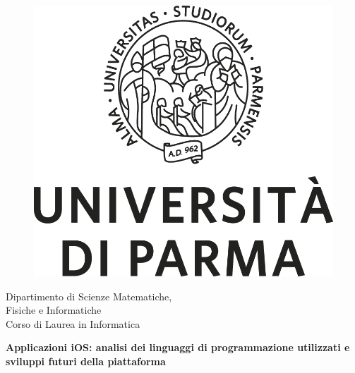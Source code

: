\begin{titlepage}
  \hypersetup{pageanchor=false}

  \begin{center}
    \begin{figure}
      \centering
      \includegraphics[scale=0.20]{logouni.png}
            \vspace{0.8cm}
    \end{figure}


    \begin{Large}
      Dipartimento di Scienze Matematiche,\\Fisiche e Informatiche\\
      \medskip
      Corso di Laurea in Informatica \\
      \medskip
      \vspace{0.8cm}
      
      \begin{huge}
        \textbf{Applicazioni iOS: analisi dei linguaggi di programmazione utilizzati e sviluppi futuri della piattaforma} \\
      \end{huge}
      
      \vspace{2.8cm}
	  

\end{Large}
\end{center}
\end{titlepage}
